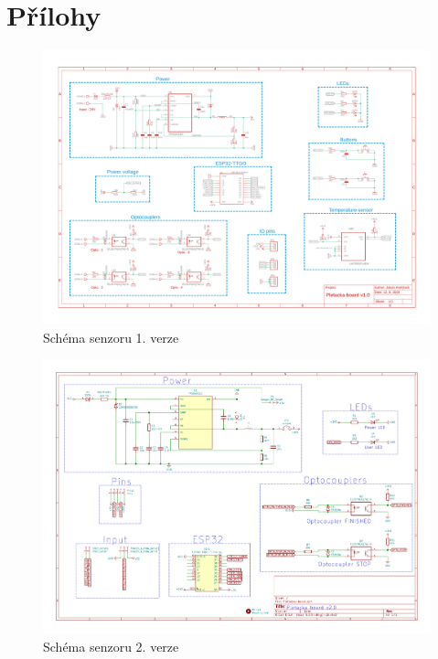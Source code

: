 \chapter{Přílohy}


\begin{figure}[htbp]
    \centering
    \includegraphics[width=\textwidth]{DATASHEET/Pletacka_board_v1.pdf}
    \caption{Schéma senzoru 1. verze}
    \label{fig:Schemav1}
\end{figure}


\begin{figure}[htbp]
    \centering
    \includegraphics[width=\textwidth]{DATASHEET/Pletacka_board_v2.pdf}
    \caption{Schéma senzoru 2. verze}
    \label{fig:Schemav1}
\end{figure}

